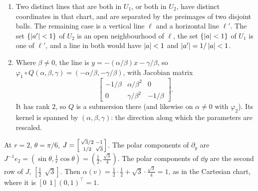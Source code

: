 \begin{enumerate}[nosep]
  \item Two distinct lines that are both in $U_1$, or both in $U_2$, have
        distinct coordinates in that chart, and are separated by the
        preimages of two disjoint balls. The remaining case is a vertical
        line $\ell$ and a horizontal line $\ell'$. The set
        $\{\left|a'\right| < 1\}$ of $U_2$ is an open neighbourhood of $\ell$,
        the set $\{\left|a\right| < 1\}$ of $U_1$ is one of $\ell'$, and a line
        in both would have $\left|a\right| < 1$ and $\left|a'\right| = 1/\left|a\right| < 1$.
  \item Where $\beta\neq0$, the line is $y = -(\alpha/\beta)x
        - \gamma/\beta$, so $\varphi_1\circ Q(\alpha, \beta, \gamma)
        = (-\alpha/\beta, -\gamma/\beta)$, with Jacobian matrix
        \[
          \begin{bmatrix}
            -1/\beta & \alpha/\beta^2 & 0\\
            0 & \gamma/\beta^2 & -1/\beta
          \end{bmatrix} .
        \]
        It has rank $2$, so $Q$ is a submersion there (and likewise on
        $\alpha\neq0$ with $\varphi_2$). Its kernel is spanned by
        $(\alpha, \beta, \gamma)$: the direction along which the
        parameters are rescaled.
\end{enumerate}

At $r = 2$, $\theta = \pi/6$,
$J = \begin{bsmallmatrix}\sqrt3/2 & -1\\ 1/2 & \sqrt3\end{bsmallmatrix}$.
The polar components of $\partial_y$ are
$J^{-1}e_2 = (\sin\theta, \frac1r\cos\theta) = (\frac12, \frac{\sqrt3}4)$.
The polar components of $\dd y$ are the second row of $J$,
$[\frac12\ \ \sqrt3]$. Then
$\alpha(v) = \frac12\cdot\frac12 + \sqrt3\cdot\frac{\sqrt3}4 = 1$, as in
the Cartesian chart, where it is $[0\ \ 1](0, 1)^\top = 1$.

